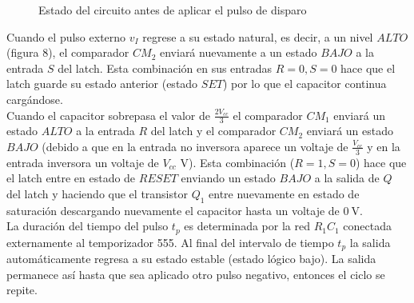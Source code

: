 \documentclass{article}
\begin{document}
\begin{figure}[H]
{}
	\caption{Estado del circuito antes de aplicar el pulso de disparo}	
	\label{fig:figura8}
\end{figure}

\noindent Cuando el pulso externo $v_I$ regrese a su estado natural, es decir, a un nivel $ALTO$ (figura 8), el comparador $CM_2$ enviará nuevamente a un estado $BAJO$ a la entrada $S$ del latch. Esta combinación en sus entradas $R=0, S=0$ hace que el latch guarde su estado anterior (estado $SET$) por lo que el capacitor continua cargándose. \\

\noindent Cuando el capacitor sobrepasa el valor de $\frac{2V_{cc}}{3}$ el comparador $CM_1$ enviará un estado $ALTO$ a la entrada $R$ del latch y el comparador $CM_2$ enviará un estado $BAJO$ (debido a que en la entrada no inversora aparece un voltaje de $\frac{V_{cc}}{3}$ y en la entrada inversora un voltaje de $V_{cc}$ V). Esta combinación ($R=1, S=0$) hace que el latch entre en estado de $RESET$ enviando un estado $BAJO$ a la salida de $Q$ del latch y haciendo que el transistor $Q_1$ entre nuevamente en estado de saturación descargando nuevamente el capacitor hasta un voltaje de $\qty{0}{\volt}$. \\

\noindent La duración del tiempo del pulso $t_p$ es determinada por la red $R_1C_1$ conectada externamente al temporizador 555. Al final del intervalo de tiempo $t_p$ la salida automáticamente regresa a su estado estable (estado lógico bajo). La salida permanece así hasta que sea aplicado otro pulso negativo, entonces el ciclo se repite. \\
\end{document}
